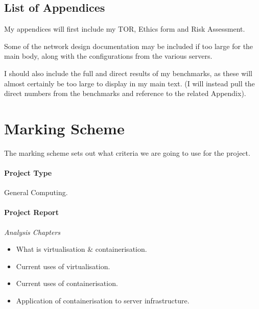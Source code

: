 


\subsection{List of Appendices}
My appendices will first include my TOR, Ethics form and Risk Assessment.

Some of the network design documentation may be included if too large for the main body, along with the configurations from the various servers.

I should also include the full and direct results of my benchmarks, as these will almost certainly be too large to display in my main text. (I will instead pull the direct numbers from the benchmarks and reference to the related Appendix).





\section{Marking Scheme}
The marking scheme sets out what criteria we are going to use for the project.

\paragraph{Project Type} General Computing.

\paragraph{Project Report}
\emph{Analysis Chapters}
\begin{itemize}
	\item What is virtualisation \& containerisation.
	\item Current uses of virtualisation.
	\item Current uses of containerisation.
	\item Application of containerisation to server infrastructure.
\end{itemize}

